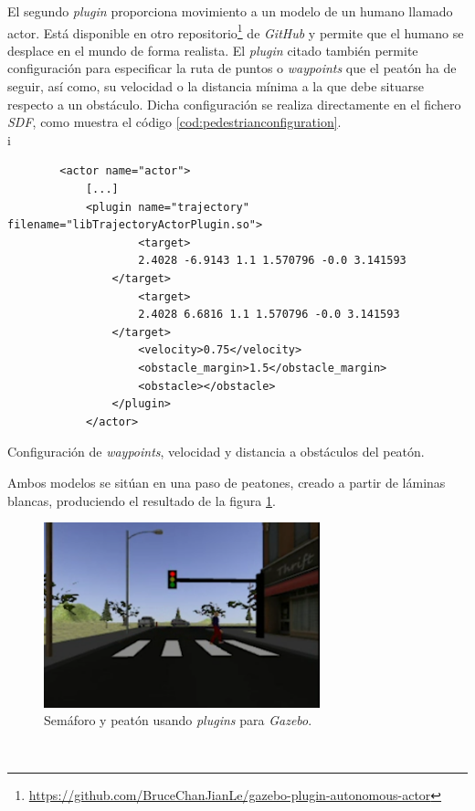 El segundo \textit{plugin} proporciona movimiento a un modelo de un humano llamado actor. Está disponible en otro
repositorio\footnote{\url{https://github.com/BruceChanJianLe/gazebo-plugin-autonomous-actor}} de \textit{GitHub} y permite que el humano se desplace en el mundo de forma
realista. El \textit{plugin} citado también permite configuración para especificar la ruta de puntos o \textit{waypoints} que el peatón ha de seguir, así como, su velocidad o la
distancia mínima a la que debe situarse respecto a un obstáculo. Dicha configuración se realiza directamente en el fichero \textit{SDF}, como muestra el código
\ref{cod:pedestrianconfiguration}.\\
i
\begin{code}[h]
	\begin{lstlisting}
		<actor name="actor">
			[...]
			<plugin name="trajectory" filename="libTrajectoryActorPlugin.so">
					<target>
					2.4028 -6.9143 1.1 1.570796 -0.0 3.141593
				</target>
					<target>
					2.4028 6.6816 1.1 1.570796 -0.0 3.141593
				</target>
					<velocity>0.75</velocity>
					<obstacle_margin>1.5</obstacle_margin>
					<obstacle></obstacle>
				</plugin>
			</actor>
	\end{lstlisting}
	\caption[Configuración de \textit{waypoints}, velocidad y distancia a obstáculos del peatón.]{Configuración de \textit{waypoints}, velocidad y distancia a obstáculos del
		peatón.}
	\label{cod:pedestrianconfiguration}
\end{code}

Ambos modelos se sitúan en una paso de peatones, creado a partir de láminas blancas, produciendo el resultado de la figura \ref{fig:trafficlightpedestrian}.\\

\begin{figure} [h!]
	\begin{center}
		\includegraphics[width=8cm]{figs/trafficlightpedestrian}
	\end{center}
	\caption{Semáforo y peatón usando \textit{plugins} para \textit{Gazebo}.}
	\label{fig:trafficlightpedestrian}
\end{figure}\


